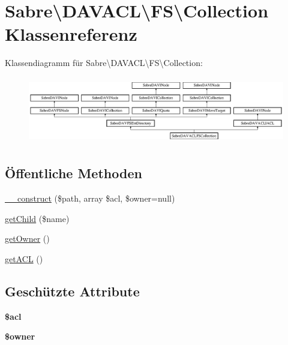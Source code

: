 \hypertarget{class_sabre_1_1_d_a_v_a_c_l_1_1_f_s_1_1_collection}{}\section{Sabre\textbackslash{}D\+A\+V\+A\+CL\textbackslash{}FS\textbackslash{}Collection Klassenreferenz}
\label{class_sabre_1_1_d_a_v_a_c_l_1_1_f_s_1_1_collection}
Klassendiagramm für Sabre\textbackslash{}D\+A\+V\+A\+CL\textbackslash{}FS\textbackslash{}Collection\+:\begin{figure}[H]
\begin{center}
\leavevmode
\includegraphics[height=2.947368cm]{class_sabre_1_1_d_a_v_a_c_l_1_1_f_s_1_1_collection}
\end{center}
\end{figure}
\subsection*{Öffentliche Methoden}
\begin{DoxyCompactItemize}
\item 
\mbox{\hyperlink{class_sabre_1_1_d_a_v_a_c_l_1_1_f_s_1_1_collection_aeb744521ba7f9f6d33274e1f09597580}{\+\_\+\+\_\+construct}} (\$path, array \$acl, \$owner=null)
\item 
\mbox{\hyperlink{class_sabre_1_1_d_a_v_a_c_l_1_1_f_s_1_1_collection_adeea47e4d71cd6ae12100e49b46b1d2b}{get\+Child}} (\$name)
\item 
\mbox{\hyperlink{class_sabre_1_1_d_a_v_a_c_l_1_1_f_s_1_1_collection_ab8caea96564eb502945e9151918b91cb}{get\+Owner}} ()
\item 
\mbox{\hyperlink{class_sabre_1_1_d_a_v_a_c_l_1_1_f_s_1_1_collection_abf277bc82822cb13082a5e2625676cf8}{get\+A\+CL}} ()
\end{DoxyCompactItemize}
\subsection*{Geschützte Attribute}
\begin{DoxyCompactItemize}
\item 
\mbox{\label{class_sabre_1_1_d_a_v_a_c_l_1_1_f_s_1_1_collection_a1bab78555190d0d9a258aa023818bdd3}} 
{\bfseries \$acl}
\item 
\mbox{\label{class_sabre_1_1_d_a_v_a_c_l_1_1_f_s_1_1_collection_af371d08b756e63bafa9211f5a499c7b9}} 
{\bfseries \$owner}
\end{DoxyCompactItemize}


